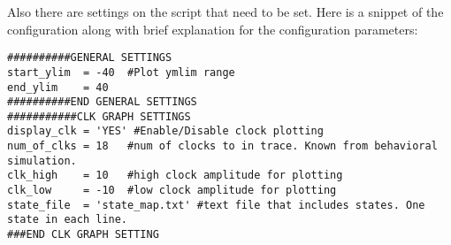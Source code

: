 Also there are settings on the script that need to be set. Here is a snippet of the configuration along with brief explanation
for the configuration parameters:
\begin{verbatim}
##########GENERAL SETTINGS                                                                                                                                                                                                                   
start_ylim  = -40  #Plot ymlim range                                                                                                                                                                                                         
end_ylim    = 40                                                                                                                                                                                                                             
##########END GENERAL SETTINGS                                                                                                                                                                                                               
###########CLK GRAPH SETTINGS                                                                                                                                                                                                                
display_clk = 'YES' #Enable/Disable clock plotting                                                                                                                                                                                           
num_of_clks = 18   #num of clocks to in trace. Known from behavioral simulation.                                                                                                                                                                                              
clk_high    = 10   #high clock amplitude for plotting                                                                                                                                                                                          
clk_low     = -10  #low clock amplitude for plotting                                                                                                                                                                                           
state_file  = 'state_map.txt' #text file that includes states. One state in each line.                                                                                                                                                                
###END CLK GRAPH SETTING
\end{verbatim}
